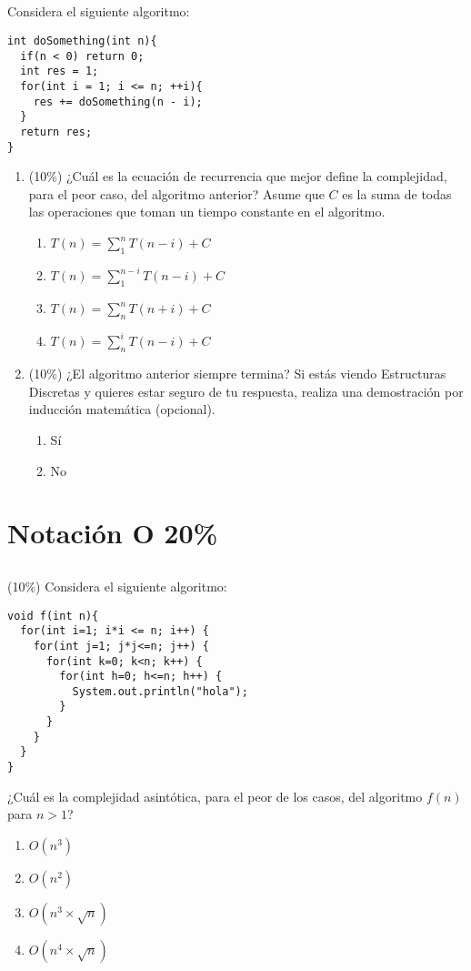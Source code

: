 \documentclass[10 pt]{article}
\begin{document}
\begin{multicols}{2}
\subsection{} Considera el siguiente algoritmo:
\begin{lstlisting}
int doSomething(int n){
  if(n < 0) return 0;
  int res = 1;
  for(int i = 1; i <= n; ++i){
    res += doSomething(n - i);
  }
  return res;
}
\end{lstlisting}
\begin{enumerate}[label=\alph*]
	\item (10\%) ¿Cuál es la ecuación de recurrencia que mejor define la complejidad, para el peor caso, del algoritmo anterior?  Asume que $C$ es la suma de todas las operaciones que toman un tiempo constante en el algoritmo.
	\begin{enumerate}[label=\roman*]
		\item $T(n) = \sum\limits_{1}^{n} T(n - i) + C$
		\item $T(n) = \sum\limits_{1}^{n - i} T(n - i) + C$
		\item $T(n) = \sum\limits_{n}^{n} T(n + i) + C$
		\item $T(n) = \sum\limits_{n}^{i} T(n - i) + C$
	\end{enumerate}
	\item (10\%) ¿El algoritmo anterior siempre termina? Si estás viendo Estructuras Discretas y quieres estar seguro de tu respuesta, realiza una demostración por inducción matemática (opcional).
	\begin{enumerate}[label=\roman*]
		\item Sí
		\item No
	\end{enumerate}
\end{enumerate}
\section{Notación O 20\%}
\subsection{} (10\%) Considera el siguiente algoritmo:
\begin{lstlisting}
void f(int n){
  for(int i=1; i*i <= n; i++) {
    for(int j=1; j*j<=n; j++) {
      for(int k=0; k<n; k++) {
        for(int h=0; h<=n; h++) {
          System.out.println("hola");
        }
      }
    }
  }
}
\end{lstlisting}
¿Cuál es la complejidad asintótica, para el peor de los casos, del algoritmo $f(n)$ para $ n > 1$?
\begin{enumerate}[label=\roman*]
	\item $O(n^3)$
	\item $O(n^2)$
	\item $O(n ^ 3 \times \sqrt{n})$
	\item $O(n ^ 4 \times \sqrt{n})$
\end{enumerate}

\end{multicols}
\end{document}
